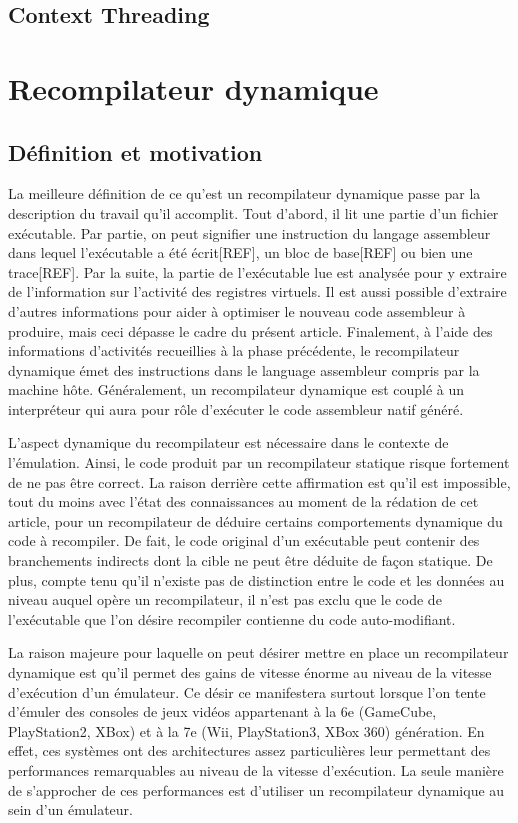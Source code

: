 \documentclass{article} %
\begin{document}
\subsection{Context Threading}

\section{Recompilateur dynamique}

\subsection{Définition et motivation}
La meilleure définition de ce qu'est un recompilateur dynamique passe par la description du travail qu'il accomplit. Tout d'abord, il lit une partie d'un fichier exécutable. Par partie, on peut signifier une instruction du langage assembleur dans lequel l'exécutable a été écrit[REF], un bloc de base[REF] ou bien une trace[REF]. Par la suite, la partie de l'exécutable lue est analysée pour y extraire de l'information sur l'activité des registres virtuels. Il est aussi possible d'extraire d'autres informations pour aider à optimiser le nouveau code assembleur à produire, mais ceci dépasse le cadre du présent article. Finalement, à l'aide des informations d'activités recueillies à la phase précédente, le recompilateur dynamique émet des instructions dans le language assembleur compris par la machine hôte. Généralement, un recompilateur dynamique est couplé à un interpréteur qui aura pour rôle d'exécuter le code assembleur natif généré.

L'aspect dynamique du recompilateur est nécessaire dans le contexte de l'émulation. Ainsi, le code produit par un recompilateur statique risque fortement de ne pas être correct. La raison derrière cette affirmation est qu'il est impossible, tout du moins avec l'état des connaissances au moment de la rédation de cet article, pour un recompilateur de déduire certains comportements dynamique du code à recompiler. De fait, le code original d'un exécutable peut contenir des branchements indirects dont la cible ne peut être déduite de façon statique. De plus, compte tenu qu'il n'existe pas de distinction entre le code et les données au niveau auquel opère un recompilateur, il n'est pas exclu que le code de l'exécutable que l'on désire recompiler contienne du code auto-modifiant.

La raison majeure pour laquelle on peut désirer mettre en place un recompilateur dynamique est qu'il permet des gains de vitesse énorme au niveau de la vitesse d'exécution d'un émulateur. Ce désir ce manifestera surtout lorsque l'on tente d'émuler des consoles de jeux vidéos appartenant à la 6e (GameCube, PlayStation2, XBox) et à la 7e (Wii, PlayStation3, XBox 360) génération. En effet, ces systèmes ont des architectures assez particulières leur permettant des performances remarquables au niveau de la vitesse d'exécution. La seule manière de s'approcher de ces performances est d'utiliser un recompilateur dynamique au sein d'un émulateur.
\end{document}
